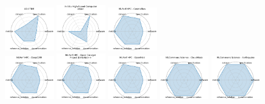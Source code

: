 \begin{figure}[ht!]
\includegraphics[width=0.1900\textwidth]{images/d-stem_radar.pdf}
\includegraphics[width=0.1900\textwidth]{images/in-situ_high-speed_computer_vision_radar.pdf}
\includegraphics[width=0.1900\textwidth]{images/mlperf_hpc_-_cosmoflow_radar.pdf}
\\[1ex]
\includegraphics[width=0.1900\textwidth]{images/mlperf_hpc_-_deepcam_radar.pdf}
\includegraphics[width=0.1900\textwidth]{images/mlperf_hpc_-_open_catalyst_project_dimenet__radar.pdf}
\includegraphics[width=0.1900\textwidth]{images/mlperf_hpc_-_openfold_radar.pdf}
\includegraphics[width=0.1900\textwidth]{images/mlcommons_science_-_cloudmask_radar.pdf}
\includegraphics[width=0.1900\textwidth]{images/mlcommons_science_-_earthquake_radar.pdf}

\end{figure}

